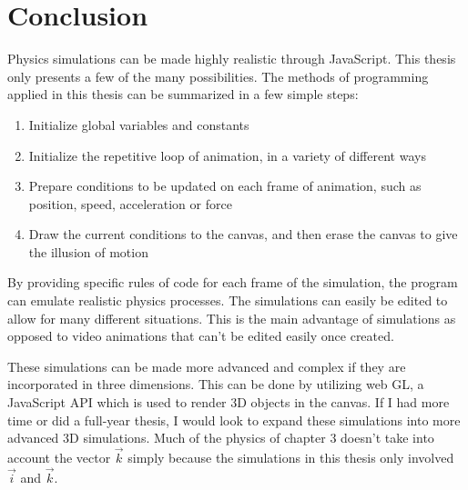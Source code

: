 
\chapter{Conclusion} %

\label{Conclusion} %



Physics simulations can be made highly realistic through JavaScript.  This thesis only presents a few of the many possibilities.  The methods of programming applied in this thesis can be summarized in a few simple steps:

\begin{enumerate}  
\item Initialize global variables and constants
\item Initialize the repetitive loop of animation, in a variety of different ways
\item Prepare conditions to be updated on each frame of animation, such as position, speed, acceleration or force
\item Draw the current conditions to the canvas, and then erase the canvas to give the illusion of motion
\end{enumerate} 

By providing specific rules of code for each frame of the simulation, the program can emulate realistic physics processes.  The simulations can easily be edited to allow for many different situations.  This is the main advantage of simulations as opposed to video animations that can't be edited easily once created.     


These simulations can be made more advanced and complex if they are incorporated in three dimensions.  This can be done by utilizing web GL, a JavaScript API which is used to render 3D objects in the canvas.  If I had more time or did a full-year thesis, I would look to expand these simulations into more advanced 3D simulations.  Much of the physics of chapter 3 doesn't take into account the vector $\vec{k}$ simply because the simulations in this thesis only involved $\vec{i}$ and $\vec{k}$.  


